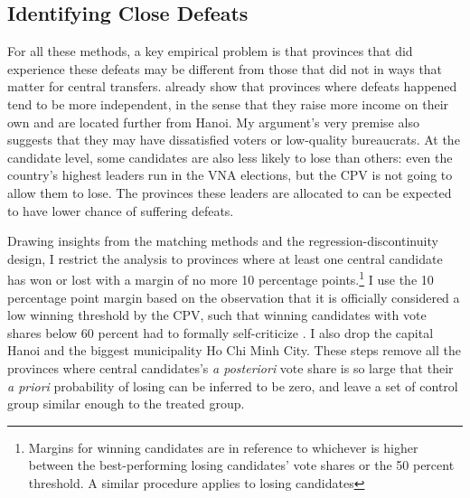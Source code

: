\documentclass[12pt]{article}
\newcommand\fnote[1]{\footnote{\baselineskip=2\normalbaselineskip#1}}
\newcommand{\1}{\mathbbm{1}}
\begin{document}
\subsection{Identifying Close Defeats}
\label{sec:methods_sample}

For all these methods, a key empirical problem is that provinces that did experience these defeats may be different from those that did not in ways that matter for central transfers. \citet{MaleskySchuler2011} already show that provinces where defeats happened tend to be more independent, in the sense that they raise more income on their own and are located further from Hanoi. My argument's very premise also suggests that they may have dissatisfied voters or low-quality bureaucrats. At the candidate level, some candidates are also less likely to lose than others: even the country's highest leaders run in the VNA elections, but the CPV is not going to allow them to lose. The provinces these leaders are allocated to can be expected to have lower chance of suffering defeats. 

Drawing insights from the matching methods and the regression-discontinuity design, I restrict the analysis to provinces where at least one central candidate has won or lost with a margin of no more 10 percentage points.\fnote{Margins for winning candidates are in reference to whichever is higher between the best-performing losing candidates' vote shares or the 50 percent threshold. A similar procedure applies to losing candidates} I use the 10 percentage point margin based on the observation that it is officially considered a low winning threshold by the CPV, such that winning candidates with vote shares below 60 percent had to formally self-criticize \citep{MaleskySchuler2011}. I also drop the capital Hanoi and the biggest municipality Ho Chi Minh City. These steps remove all the provinces where central candidates's \textit{a posteriori} vote share is so large that their \textit{a priori} probability of losing can be inferred to be zero, and leave a set of control group similar enough to the treated group.
\end{document}
